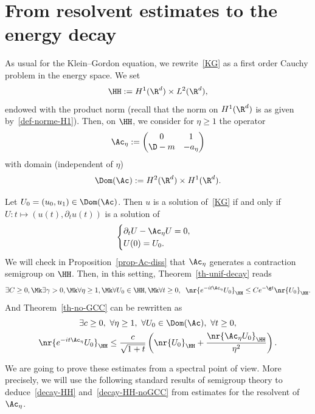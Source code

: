 \section{From resolvent estimates to the energy decay} \label{sec-resolvent-to-time}

As usual for the Klein--Gordon equation, we rewrite~\eqref{KG} as a first order Cauchy problem in the energy space. We set
\[
\HH := H^1(\R^d) \times L^2(\R^d),
\]
endowed with the product norm (recall that the norm on $H^1(\R^d)$ is as given by~\eqref{def-norme-H1}). Then, on $\HH$, we consider for $\eta \geq 1$ the operator
\[
\Ac_\eta :=
\begin{pmatrix}
0 & 1 \\
\D - m & -a_\eta
\end{pmatrix}
\]
with domain (independent of $\eta$)
\[
\Dom(\Ac) := H^2(\R^d) \times H^1(\R^d).
\]

Let $U_0 = (u_0,u_1) \in \Dom(\Ac)$. Then $u$ is a solution of~\eqref{KG} if and only if $U : t \mapsto (u(t),\partial_t u(t))$ is a solution of
\begin{equation}\label{KG-Ac}
\begin{cases}
\partial_t U - \Ac_\eta U = 0,\\
U(0) = U_0.
\end{cases}
\end{equation}
We will check in Proposition~\ref{prop-Ac-diss} that $\Ac_\eta$ generates a contraction semigroup on $\HH$. Then, in this setting, Theorem~\ref{th-unif-decay} reads
\begin{equation}\label{decay-HH}
\exists C \geq 0,\Mk \exists \gamma > 0,\Mk \forall \eta \geq 1,\Mk \forall U_0 \in \HH,\Mk \forall t \geq 0, \;\; \nr{e^{-it\Ac_\eta} U_0}_{\HH} \leq C e^{-\g t} \nr{U_0}_{\HH}.
\end{equation}
And Theorem~\ref{th-no-GCC} can be rewritten as
\begin{multline}\label{decay-HH-noGCC}
\exists c \geq 0,\ \forall \eta \geq 1,\ \forall U_0 \in \Dom(\Ac),\ \forall t \geq 0,
\\ \nr{e^{-it\Ac_\eta} U_0}_{\HH} \leq \frac c {\sqrt{1+t}} \left(\nr{U_0}_\HH + \frac {\nr{\Ac_\eta U_0}_{\HH}}{\eta^2} \right).
\end{multline}

We are going to prove these estimates from a spectral point of view. More precisely, we will use the following standard results of semigroup theory to deduce~\eqref{decay-HH} and~\eqref{decay-HH-noGCC} from estimates for the resolvent of $\Ac_\eta$.

